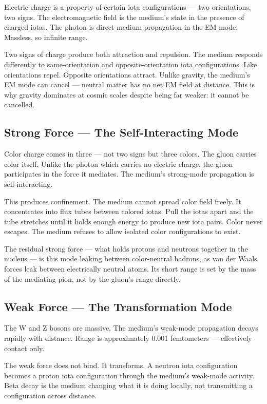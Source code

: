 \documentclass[11pt]{article}
\begin{document}
Electric charge is a property of certain iota configurations — two orientations,
two signs. The electromagnetic field is the medium's state in the presence of
charged iotas. The photon is direct medium propagation in the EM mode. Massless,
so infinite range.

Two signs of charge produce both attraction and repulsion. The medium responds
differently to same-orientation and opposite-orientation iota configurations.
Like orientations repel. Opposite orientations attract. Unlike gravity, the
medium's EM mode can cancel — neutral matter has no net EM field at distance.
This is why gravity dominates at cosmic scales despite being far weaker: it
cannot be cancelled.

\subsection{Strong Force — The Self-Interacting Mode}
\label{sec:org7e01214}

Color charge comes in three — not two signs but three colors. The gluon carries
color itself. Unlike the photon which carries no electric charge, the gluon
participates in the force it mediates. The medium's strong-mode propagation is
self-interacting.

This produces confinement. The medium cannot spread color field freely. It
concentrates into flux tubes between colored iotas. Pull the iotas apart and the
tube stretches until it holds enough energy to produce new iota pairs. Color
never escapes. The medium refuses to allow isolated color configurations to exist.

The residual strong force — what holds protons and neutrons together in the
nucleus — is this mode leaking between color-neutral hadrons, as van der Waals
forces leak between electrically neutral atoms. Its short range is set by the
mass of the mediating pion, not by the gluon's range directly.

\subsection{Weak Force — The Transformation Mode}
\label{sec:org6c2d8d4}

The W and Z bosons are massive. The medium's weak-mode propagation decays
rapidly with distance. Range is approximately 0.001 femtometers — effectively
contact only.

The weak force does not bind. It transforms. A neutron iota configuration becomes
a proton iota configuration through the medium's weak-mode activity. Beta decay
is the medium changing what it is doing locally, not transmitting a configuration
across distance.
\end{document}
